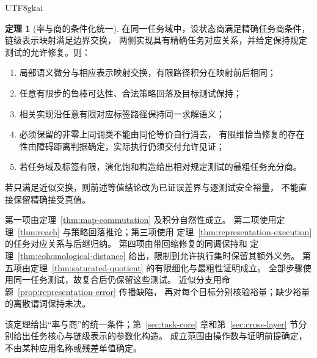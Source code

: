 \documentclass[12pt]{report}
\makeatletter
\theoremstyle{definition}
\newtheorem{theorem}{定理}[chapter]
\renewenvironment{proof}[1][\proofname]{\par
  \pushQED{\qed}\normalfont
  \topsep6\p@\@plus6\p@\relax
  \trivlist
  \item[\hskip\labelsep\normalfont #1\@addpunct{.}]\ignorespaces
}{
  \popQED\endtrivlist\@endpefalse
}
\makeatother
\begin{document}
\begin{CJK*}{UTF8}{gkai}
\begin{theorem}[率与商的条件化统一]
\label{thm:calculus-unification}
在同一任务域中，设状态商满足精确任务商条件，链级表示映射满足边界交换，
两侧实现具有精确任务对应关系，并给定保持规定测试的允许修复。则：
\begin{enumerate}
\item 局部语义微分与相应表示映射交换，有限路径积分在映射前后相同；
\item 任意有限步的鲁棒可达性、合法策略回落及目标测试保持；
\item 相关实现沿任意有限对应标签路径保持同一求解语义；
\item 必须保留的非零上同调类不能由同伦等价自行消去，
有限维恰当修复的存在性由障碍距离判据确定，实际执行仍须交付允许见证；
\item 若任务域及标签有限，演化饱和构造给出相对规定测试的最粗任务充分商。
\end{enumerate}
若只满足近似交换，则前述等值结论改为已证误差界与逐测试安全裕量，
不能直接保留精确接受真值。
\end{theorem}
\begin{proof}
第一项由定理~\ref{thm:map-commutation} 及积分自然性成立。
第二项使用定理~\ref{thm:reach} 与策略回落推论；第三项使用
定理~\ref{thm:representation-execution} 的任务对应关系与后继归纳。
第四项由带回缩修复的同调保持和
定理~\ref{thm:cohomological-distance} 给出，限制到允许执行集时保留其额外义务。
第五项由定理~\ref{thm:saturated-quotient} 的有限细化与最粗性证明成立。
全部步骤使用同一任务测试，故复合后仍保留这些测试。
近似分支用命题~\ref{prop:representation-error} 传播缺陷，
再对每个目标分别核验裕量；缺少裕量的离散谓词保持未决。
\end{proof}
该定理给出“率与商”的统一条件；第~\ref{sec:task-core} 章和第~\ref{sec:cross-layer} 节分别给出任务核心与链级表示的参数化构造。
成立范围由操作数与证明前提确定，不由某种应用名称或残差单值确定。


\end{CJK*}
\end{document}
